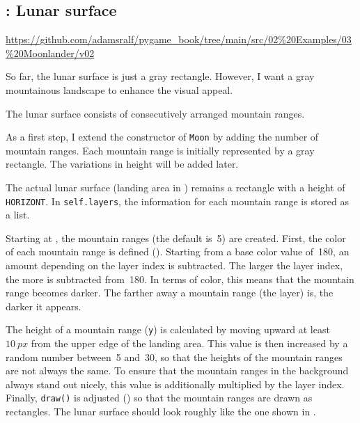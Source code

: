 \subsection{: Lunar surface}
\begin{diskbox}
	\url{https://github.com/adamsralf/pygame_book/tree/main/src/02%20Examples/03%20Moonlander/v02}
\end{diskbox}
So far, the lunar surface is just a gray rectangle. However, I want a gray mountainous landscape to enhance the visual appeal.

	The lunar surface consists of consecutively arranged mountain ranges.
\er

As a first step, I extend the constructor of \texttt{Moon} by adding the number of mountain ranges. Each mountain range is initially represented by a gray rectangle. The variations in height will be added later.

The actual lunar surface (landing area in ) remains a rectangle with a height of \texttt{HORIZONT}. In \texttt{self.layers}, the information for each mountain range is stored as a list.

Starting at , the mountain ranges (the default is~5) are created. First, the color of each mountain range is defined (). Starting from a base color value of~180, an amount depending on the layer index is subtracted. The larger the layer index, the more is subtracted from~180. In terms of color, this means that the mountain range becomes darker. The farther away a mountain range (the layer) is, the darker it appears.


\begin{figure}%
	\begin{center}%
		\vspace{-4ex}%
	\end{center}%
\end{figure}%
The height of a mountain range (\texttt{y}) is calculated by moving upward at least~$\SI{10}{px}$ from the upper edge of the landing area. This value is then increased by a random number between~5 and~30, so that the heights of the mountain ranges are not always the same. To ensure that the mountain ranges in the background always stand out nicely, this value is additionally multiplied by the layer index. Finally, \texttt{draw()} is adjusted () so that the mountain ranges are drawn as rectangles. The lunar surface should look roughly like the one shown in .


